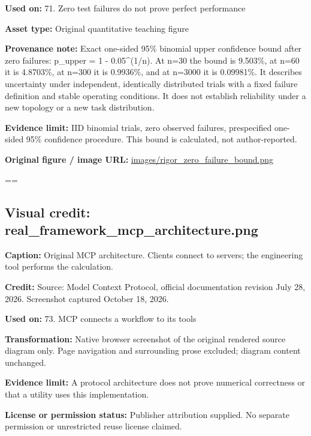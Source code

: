 \documentclass[10pt,letterpaper]{article}
\begin{document}
\textbf{Used on:} 71. Zero test failures do not prove perfect performance\par
\textbf{Asset type:} Original quantitative teaching figure\par
\textbf{Provenance note:} Exact one-sided 95\% binomial upper confidence bound after zero failures: p\_upper = 1 - 0.05\textasciicircum{}(1/n). At n=30 the bound is 9.503\%, at n=60 it is 4.8703\%, at n=300 it is 0.9936\%, and at n=3000 it is 0.09981\%. It describes uncertainty under independent, identically distributed trials with a fixed failure definition and stable operating conditions. It does not establish reliability under a new topology or a new task distribution.\par
\textbf{Evidence limit:} IID binomial trials, zero observed failures, prespecified one-sided 95\% confidence procedure. This bound is calculated, not author-reported.\par
\textbf{Original figure / image URL:} \href{images/rigor_zero_failure_bound.png}{\small\ttfamily images/\allowbreak{}rigor\_\allowbreak{}zero\_\allowbreak{}failure\_\allowbreak{}bound.\allowbreak{}png}\par
\egroup\par\noindent\box\readingEntry\par\medskip
\setbox\readingEntry=\vbox\bgroup\hsize=\linewidth\subsection*{Visual credit: real\_framework\_mcp\_architecture.png}
\textbf{Caption:} Original MCP architecture. Clients connect to servers; the engineering tool performs the calculation.\par
\textbf{Credit:} Source: Model Context Protocol, official documentation revision July 28, 2026. Screenshot captured October 18, 2026.\par
\textbf{Used on:} 73. MCP connects a workflow to its tools\par
\textbf{Transformation:} Native browser screenshot of the original rendered source diagram only. Page navigation and surrounding prose excluded; diagram content unchanged.\par
\textbf{Evidence limit:} A protocol architecture does not prove numerical correctness or that a utility uses this implementation.\par
\textbf{License or permission status:} Publisher attribution supplied. No separate permission or unrestricted reuse license claimed.\par
\end{document}
